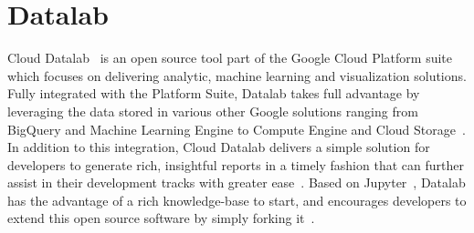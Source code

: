 \section{Datalab}

Cloud Datalab~\cite{hid-sp18-504-google-datalab} is an open source tool 
part of the Google Cloud Platform suite which focuses on delivering
analytic, machine learning and visualization solutions. Fully integrated
with the Platform Suite, Datalab takes full advantage by leveraging
the data stored in various other Google solutions ranging from
BigQuery and Machine Learning Engine to Compute Engine and
Cloud Storage~\cite{hid-sp18-504-google-datalab}. In addition to this
integration, Cloud Datalab delivers a simple solution for 
developers to generate rich, insightful reports in a timely fashion
that can further assist in their development tracks with greater
ease~\cite{hid-sp18-504-techcrunch-datalab}.
Based on Jupyter~\cite{hid-sp18-504-google-datalab}, Datalab has the 
advantage of a rich knowledge-base to start, and encourages developers 
to extend this open source software by simply 
forking it~\cite{hid-sp18-504-techcrunch-datalab}.
